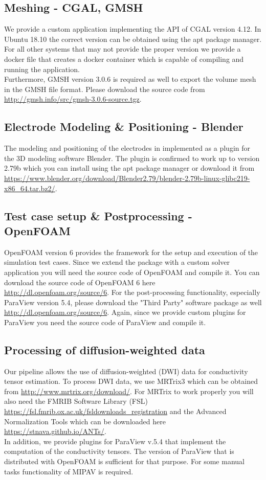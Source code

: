 \subsection{Meshing - CGAL, GMSH}
We provide a custom application implementing the API of CGAL version 4.12. In Ubuntu 18.10 the correct version can be obtained
using the apt package manager. For all other systems that may not provide the proper version we provide a docker file that creates
a docker container which is capable of compiling and running the application.\\
Furthermore, GMSH version 3.0.6 is required as well to export the volume mesh in the GMSH file format. Please download the source
code from \url{http://gmsh.info/src/gmsh-3.0.6-source.tgz}. 

\subsection{Electrode Modeling \& Positioning - Blender}
The modeling and positioning of the electrodes in implemented as a plugin for the 3D modeling software Blender. The plugin is
confirmed to work up to version 2.79b which you can install using the apt package manager or download it from 
\url{https://www.blender.org/download/Blender2.79/blender-2.79b-linux-glibc219-x86\_64.tar.bz2/}.

\subsection{Test case setup \& Postprocessing - OpenFOAM}
OpenFOAM version 6 provides the framework for the setup and execution of the simulation test cases. Since we extend the package
with a custom solver application you will need the source code of OpenFOAM and compile it. You can download the source code of
OpenFOAM 6 here \url{http://dl.openfoam.org/source/6}. For the post-processing functionality, especially ParaView version 5.4,
please download the "Third Party" software package as well \url{http://dl.openfoam.org/source/6}. Again, since we provide
custom plugins for ParaView you need the source code of ParaView and compile it.

\subsection{Processing of diffusion-weighted data}
Our pipeline allows the use of diffusion-weighted (DWI) data for conductivity tensor estimation. To process DWI data, we use
MRTrix3 which can be obtained from \url{http://www.mrtrix.org/download/}. For MRTrix to work properly you will also need
the FMRIB Software Library (FSL) \url{https://fsl.fmrib.ox.ac.uk/fsldownloads\_registration} and the Advanced Normalization Tools
which can be downloaded here \url{https://stnava.github.io/ANTs/}.\\
In addition, we provide plugins for ParaView v.5.4 that implement the computation of the conductivity tensors. The version of
ParaView that is distributed with OpenFOAM is sufficient for that purpose. For some manual tasks functionality of MIPAV is required.


